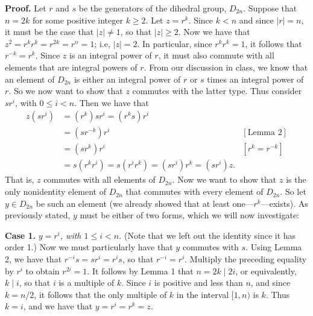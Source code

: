 \documentclass[9pt]{article}
\begin{document}
\begin{enumerate}
      \textbf{Proof.} Let $r$ and $s$ be the generators of the dihedral group,
      $D_{2n}$. Suppose that $n = 2k$ for some positive integer $k \ge 2$.
      Let $z = r^k$. Since $k < n$ and since $|r| = n$, it must be
      the case that $|z| \neq 1$, so that $|z| \ge 2$. Now we have that
      $z^2 = r^kr^k = r^{2k} = r^n = 1$; i.e, $|z| = 2$. In particular, since
      $r^kr^k = 1$, it follows that $r^{-k} = r^k$. Since $z$ is an integral
      power of $r$, it must also commute with all elements that are integral 
      powers of $r$. From our discussion in class, we know that an element of
      $D_{2n}$ is either an integral power of $r$ or $s$ times an integral power
      of $r$. So we now want to show that $z$ commutes with the latter type.
      Thus consider $sr^i$, with $0 \le i < n$. Then we have that
      \begin{align*}
         z(sr^i) &= (r^k)sr^i = (r^ks)r^i  \\
               &= (sr^{-k})r^i  &[\text{Lemma 2}] \\
               &= (sr^k)r^i     &[r^k = r^{-k}] \\
               &= s(r^kr^i) = s(r^ir^k) = (sr^i)r^k = (sr^i)z.
      \end{align*}
      That is, $z$ commutes with all elements of $D_{2n}$. Now we want to show
      that $z$ is the only nonidentity element of $D_{2n}$ that commutes with
      every element of $D_{2n}$. So let $y \in D_{2n}$ be such an element (we
      already showed that at least one---$r^k$---exists). As previously stated,
      $y$ must be either of two forms, which we will now investigate:
      
      \textbf{Case 1.} \textit{$y = r^i$, with $1 \le i < n$.} (Note that we
      left out the identity since it has order 1.) Now we must particularly have 
      that $y$ commutes with $s$. Using Lemma 2, we have that
      $r^{-i}s = sr^i = r^is$, so that $r^{-i} = r^i$. Multiply the preceding 
      equality by $r^i$ to obtain $r^{2i} = 1$. It follows by Lemma 1 that
      $n = 2k \mid 2i$, or equivalently, $k \mid i$, so that $i$ is a multiple
      of $k$. Since $i$ is positive and less than $n$, and since $k = n/2$, it 
      follows that the only multiple of $k$ in the interval $[1, n)$ is $k$.
      Thus $k = i$, and we have that $y = r^i = r^k = z$.
      

\end{enumerate}
\end{document}

